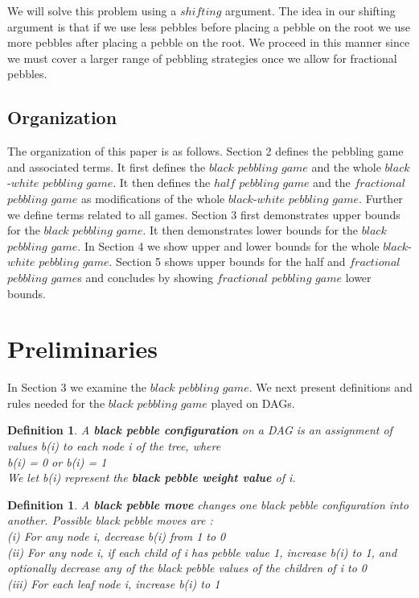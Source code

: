 \documentclass[12pt]{article}
\newtheorem{definition}[theorem]{Definition}
\begin{document}
We will solve this problem using a $shifting$ argument. The idea in our shifting argument is that if we use less pebbles before placing a pebble on the root we use more pebbles after placing a pebble on the root. We proceed in this manner since we must cover a larger range of pebbling strategies once we allow for fractional pebbles.\\




\subsection{Organization} 

The organization of this paper is as follows. Section 2 defines the pebbling game and associated terms. It first defines the $black$ $pebbling$ $game$ and the whole $black$-$white$ $pebbling$ $game$. It then defines the $half$ $pebbling$ $game$ and the $fractional $ $pebbling$ $game$ as modifications of the whole $black$-$white$ $pebbling$ $game$. Further we define terms related to all games. Section 3 first demonstrates upper bounds for the $black$ $pebbling$ $game$. It then demonstrates lower bounds for the $black$ $pebbling$ $game$. In Section 4 we show upper and lower bounds for the whole $black$-$white$ $pebbling$ $game$. Section 5 shows upper bounds for the half and $fractional $ $pebbling$ $game$s and concludes by showing $fractional $ $pebbling$ $game$ lower bounds.



\newpage

\section{Preliminaries} 

In Section 3 we examine the $black$ $pebbling$ $game$. We next present definitions and rules needed for the $black$ $pebbling$ $game$ played on DAGs.

\begin{definition}

A {\bf black pebble configuration} on a DAG is an
assignment of values b(i) to each node i of the tree, where\\
b(i) = 0 or b(i) = 1\\
We let b(i) represent the {\bf black pebble weight value} of i.
\end{definition}

\begin{definition}
\noindent
A {\bf black pebble move} changes one black pebble configuration into another. Possible black pebble moves are :\\
(i) For any node i, decrease b(i) from 1 to 0\\
(ii) For any node i, if each child of i has pebble value 1, increase b(i) to 1, and optionally decrease any of the black pebble values of the children of i to 0\\
(iii) For each leaf node i, increase b(i) to 1
\end{definition}
\end{document}
